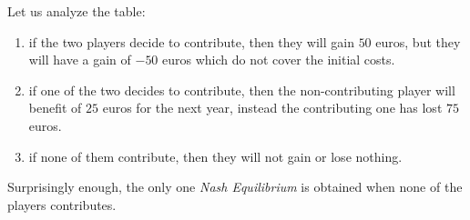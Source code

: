 \documentclass{article}
\begin{document}
\noindent Let us analyze the table:
\begin{enumerate}
    \item if the two players decide to contribute, then they will gain $50$ euros, but they will have a gain of $-50$ euros which do not cover the initial costs.
    \item if one of the two decides to contribute, then the non-contributing player will benefit of $25$ euros for the next year, instead the contributing one has lost $75$ euros.
    \item if none of them contribute, then they will not gain or lose nothing.
\end{enumerate}

\noindent Surprisingly enough, the only one \textit{Nash Equilibrium} is obtained when none of the players contributes.
\end{document}
